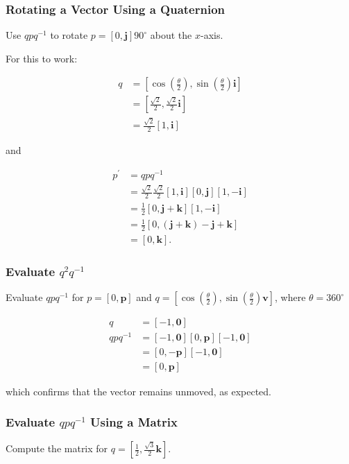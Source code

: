 \documentclass[10pt]{article}
\begin{document}
\subsubsection{Rotating a Vector Using a Quaternion}
Use $q p q^{-1}$ to rotate $p=[0, \mathbf{j}] 90^{\circ}$ about the $x$-axis.

For this to work:

$$
\begin{aligned}
q & =\left[\cos \left(\frac{\theta}{2}\right), \sin \left(\frac{\theta}{2}\right) \mathbf{i}\right] \\
& =\left[\frac{\sqrt{2}}{2}, \frac{\sqrt{2}}{2} \mathbf{i}\right] \\
& =\frac{\sqrt{2}}{2}[1, \mathbf{i}]
\end{aligned}
$$

and

$$
\begin{aligned}
p^{\prime} & =q p q^{-1} \\
& =\frac{\sqrt{2}}{2} \frac{\sqrt{2}}{2}[1, \mathbf{i}][0, \mathbf{j}][1,-\mathbf{i}] \\
& =\frac{1}{2}[0, \mathbf{j}+\mathbf{k}][1,-\mathbf{i}] \\
& =\frac{1}{2}[0,(\mathbf{j}+\mathbf{k})-\mathbf{j}+\mathbf{k}] \\
& =[0, \mathbf{k}] .
\end{aligned}
$$

\subsubsection{Evaluate $q^{2} q^{-1}$}
Evaluate $q p q^{-1}$ for $p=[0, \mathbf{p}]$ and $q=\left[\cos \left(\frac{\theta}{2}\right), \sin \left(\frac{\theta}{2}\right) \mathbf{v}\right]$, where $\theta=360^{\circ}$

$$
\begin{aligned}
q & =[-1, \mathbf{0}] \\
q p q^{-1} & =[-1, \mathbf{0}][0, \mathbf{p}][-1, \mathbf{0}] \\
& =[0,-\mathbf{p}][-1, \mathbf{0}] \\
& =[0, \mathbf{p}]
\end{aligned}
$$

which confirms that the vector remains unmoved, as expected.

\subsubsection{Evaluate $q p q^{-1}$ Using a Matrix}
Compute the matrix for $q=\left[\frac{1}{2}, \frac{\sqrt{3}}{2} \mathbf{k}\right]$.
\end{document}
